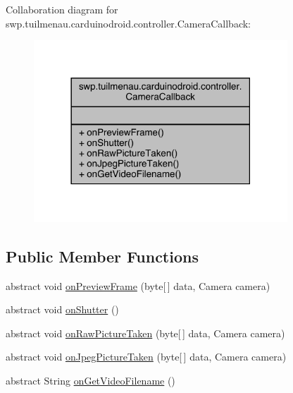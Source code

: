 Collaboration diagram for swp.\+tuilmenau.\+carduinodroid.\+controller.\+Camera\+Callback\+:
\nopagebreak
\begin{figure}[H]
\begin{center}
\leavevmode
\includegraphics[width=270pt]{interfaceswp_1_1tuilmenau_1_1carduinodroid_1_1controller_1_1_camera_callback__coll__graph}
\end{center}
\end{figure}
\subsection*{Public Member Functions}
\begin{DoxyCompactItemize}
\item 
abstract void \hyperlink{interfaceswp_1_1tuilmenau_1_1carduinodroid_1_1controller_1_1_camera_callback_af289d167147fc931021807a91936ddf9}{on\+Preview\+Frame} (byte\mbox{[}$\,$\mbox{]} data, Camera camera)
\item 
abstract void \hyperlink{interfaceswp_1_1tuilmenau_1_1carduinodroid_1_1controller_1_1_camera_callback_a30aa84ddd47b4a441246873824bfef48}{on\+Shutter} ()
\item 
abstract void \hyperlink{interfaceswp_1_1tuilmenau_1_1carduinodroid_1_1controller_1_1_camera_callback_aa2ac80b68898674885323f6aaeeaf94c}{on\+Raw\+Picture\+Taken} (byte\mbox{[}$\,$\mbox{]} data, Camera camera)
\item 
abstract void \hyperlink{interfaceswp_1_1tuilmenau_1_1carduinodroid_1_1controller_1_1_camera_callback_a5b358bbeb91e1b5b8e3f1dc2ce9fcd95}{on\+Jpeg\+Picture\+Taken} (byte\mbox{[}$\,$\mbox{]} data, Camera camera)
\item 
abstract String \hyperlink{interfaceswp_1_1tuilmenau_1_1carduinodroid_1_1controller_1_1_camera_callback_a5ca843e916557f8e59378fa7dade887a}{on\+Get\+Video\+Filename} ()
\end{DoxyCompactItemize}


